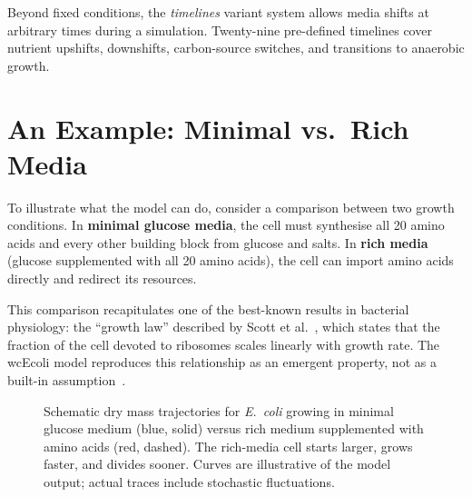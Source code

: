 \documentclass[11pt,a4paper]{article}
\begin{document}
Beyond fixed conditions, the \emph{timelines} variant system allows media
shifts at arbitrary times during a simulation.  Twenty-nine pre-defined
timelines cover nutrient upshifts, downshifts, carbon-source switches, and
transitions to anaerobic growth.


\section{An Example: Minimal vs.\ Rich Media}
\label{sec:example}

To illustrate what the model can do, consider a comparison between two growth
conditions.  In \textbf{minimal glucose media}, the cell must synthesise all
20 amino acids and every other building block from glucose and salts.  In
\textbf{rich media} (glucose supplemented with all 20 amino acids), the cell
can import amino acids directly and redirect its resources.

This comparison recapitulates one of the best-known results in bacterial
physiology: the ``growth law'' described by Scott et al.~\cite{Scott2010},
which states that the fraction of the cell devoted to ribosomes scales
linearly with growth rate.  The wcEcoli model reproduces this relationship
as an emergent property, not as a built-in assumption~\cite{AhnHorst2022}.

\begin{figure}[H]
\centering
{}
\caption{Schematic dry mass trajectories for \textit{E.~coli} growing in
  minimal glucose medium (blue, solid) versus rich medium supplemented with
  amino acids (red, dashed).  The rich-media cell starts larger, grows
  faster, and divides sooner.  Curves are illustrative of the model output;
  actual traces include stochastic fluctuations.}
\label{fig:mass}
\end{figure}
\end{document}
